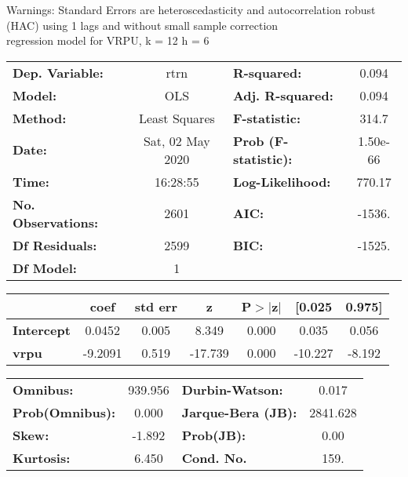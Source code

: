 Warnings: \newline
 [1] Standard Errors are heteroscedasticity and autocorrelation robust (HAC) using 1 lags and without small sample correction\\ 

regression model for VRPU, k = 12 h = 6\begin{center}
\begin{tabular}{lclc}
\toprule
\textbf{Dep. Variable:}    &       rtrn       & \textbf{  R-squared:         } &     0.094   \\
\textbf{Model:}            &       OLS        & \textbf{  Adj. R-squared:    } &     0.094   \\
\textbf{Method:}           &  Least Squares   & \textbf{  F-statistic:       } &     314.7   \\
\textbf{Date:}             & Sat, 02 May 2020 & \textbf{  Prob (F-statistic):} &  1.50e-66   \\
\textbf{Time:}             &     16:28:55     & \textbf{  Log-Likelihood:    } &    770.17   \\
\textbf{No. Observations:} &        2601      & \textbf{  AIC:               } &    -1536.   \\
\textbf{Df Residuals:}     &        2599      & \textbf{  BIC:               } &    -1525.   \\
\textbf{Df Model:}         &           1      & \textbf{                     } &             \\
\bottomrule
\end{tabular}
\begin{tabular}{lcccccc}
                   & \textbf{coef} & \textbf{std err} & \textbf{z} & \textbf{P$> |$z$|$} & \textbf{[0.025} & \textbf{0.975]}  \\
\midrule
\textbf{Intercept} &       0.0452  &        0.005     &     8.349  &         0.000        &        0.035    &        0.056     \\
\textbf{vrpu}      &      -9.2091  &        0.519     &   -17.739  &         0.000        &      -10.227    &       -8.192     \\
\bottomrule
\end{tabular}
\begin{tabular}{lclc}
\textbf{Omnibus:}       & 939.956 & \textbf{  Durbin-Watson:     } &    0.017  \\
\textbf{Prob(Omnibus):} &   0.000 & \textbf{  Jarque-Bera (JB):  } & 2841.628  \\
\textbf{Skew:}          &  -1.892 & \textbf{  Prob(JB):          } &     0.00  \\
\textbf{Kurtosis:}      &   6.450 & \textbf{  Cond. No.          } &     159.  \\
\bottomrule
\end{tabular}
\end{center}

